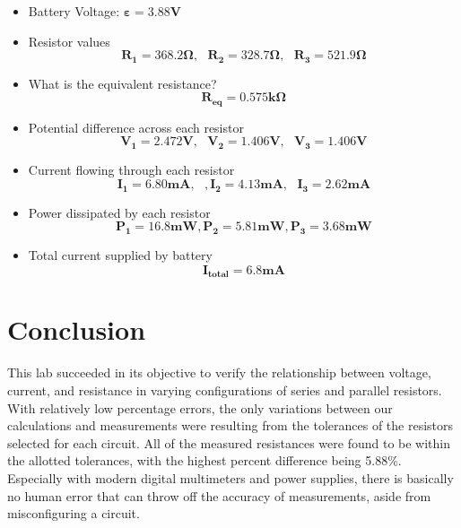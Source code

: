 \documentclass[titlepage]{article}
\begin{document}
    \begin{itemize} 
        \item Battery Voltage: $\mathbf{\varepsilon = 3.88V }$ 
        \item Resistor values $$\mathbf{R_1 =368.2\Omega, \text{     } R_2 = 328.7 \Omega , \text{      } R_3 = 521.9 \Omega }$$
        \item What is the equivalent resistance?\\ $$\mathbf{ R_{eq} = 0.575k \Omega}$$

        \item Potential difference across each resistor
        $$\mathbf{V_1 = 2.472V, \text{    } V_2 = 1.406V, \text{    } V_3 = 1.406V}$$
        \item Current flowing through each resistor 
            $$\mathbf{ I_1 = 6.80 mA, \text{   }, I_2 = 4.13 mA, \text{    } I_3 = 2.62 mA }$$
        \item Power dissipated by each resistor 
            $$\mathbf{ P_1 = 16.8mW, P_2 = 5.81 mW, P_3 = 3.68mW }$$
        \item Total current supplied by battery
            $$\mathbf{I_\text{total} = 6.8 mA}$$
    \end{itemize}




	\section{Conclusion}
    This lab succeeded in its objective to verify the relationship between voltage, current, and resistance in varying configurations of series and parallel resistors. With relatively low percentage errors, the only variations between our calculations and measurements were resulting from the tolerances of the resistors selected for each circuit. All of the measured resistances were found to be within the allotted tolerances, with the highest percent difference being 5.88\%. Especially with modern digital multimeters and power supplies, there is basically no human error that can throw off the accuracy of measurements, aside from misconfiguring a circuit.
\end{document}
